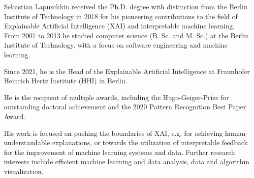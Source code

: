 \documentclass[10pt,a4paper]{article} %
\begin{document}
\spacedhrule{0.9em}{-0.4em} %



\vspace{-1.3em} %

\begin{multicols}{2}  %
\noindent

Sebastian Lapuschkin received the Ph.D. degree with distinction from the Berlin Institute of Technology in 2018
for his pioneering contributions to the field of Explainable Artificial Intelligence (XAI) and interpretable machine learning.
From 2007 to 2013 he studied computer science (B. Sc. and M. Sc.) at the Berlin Institute of Technology,
with a focus on software engineering and machine learning.

Since 2021, he is the Head of the Explainable Artificial Intelligence at Fraunhofer Heinrich Hertz Institute (HHI) in Berlin.

He is the recipient of multiple awards, including the Hugo-Geiger-Prize for outstanding doctoral achievement and the 2020 Pattern Recognition Best Paper Award.

His work is focused on pushing the boundaries of XAI, e.g, for achieving human-understandable explanations, or towards the utilization of interpretable feedback for the improvement of machine learning systems and data.
Further research interests include efficient machine learning and data analysis, data and algorithm visualization.


\end{multicols}

\spacedhrule{0.5em}{-0.4em} %



\end{document}
